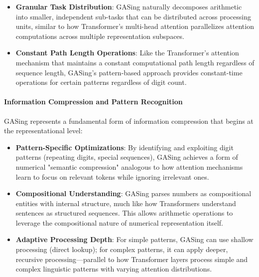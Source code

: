 \begin{itemize}
\item \textbf{Granular Task Distribution}: GASing naturally decomposes arithmetic into smaller, independent sub-tasks that can be distributed across processing units, similar to how Transformer's multi-head attention parallelizes attention computations across multiple representation subspaces.
\end{itemize}

\begin{itemize}
\item \textbf{Constant Path Length Operations}: Like the Transformer's attention mechanism that maintains a constant computational path length regardless of sequence length, GASing's pattern-based approach provides constant-time operations for certain patterns regardless of digit count.
\end{itemize}
\paragraph{Information Compression and Pattern Recognition}

GASing represents a fundamental form of information compression that begins at the representational level:

\begin{itemize}
\item \textbf{Pattern-Specific Optimizations}: By identifying and exploiting digit patterns (repeating digits, special sequences), GASing achieves a form of numerical "semantic compression" analogous to how attention mechanisms learn to focus on relevant tokens while ignoring irrelevant ones.
\end{itemize}

\begin{itemize}
\item \textbf{Compositional Understanding}: GASing parses numbers as compositional entities with internal structure, much like how Transformers understand sentences as structured sequences. This allows arithmetic operations to leverage the compositional nature of numerical representation itself.
\end{itemize}

\begin{itemize}
\item \textbf{Adaptive Processing Depth}: For simple patterns, GASing can use shallow processing (direct lookup); for complex patterns, it can apply deeper, recursive processing—parallel to how Transformer layers process simple and complex linguistic patterns with varying attention distributions.
\end{itemize}
